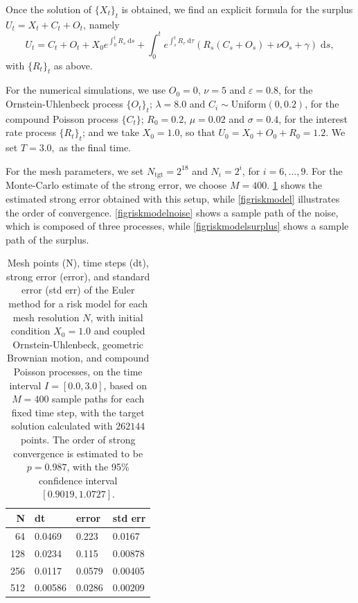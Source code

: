 \documentclass[reqno,12pt]{amsart}
\theoremstyle{plain} %
\theoremstyle{definition} %
\begin{document}
Once the solution of $\{X_t\}_t$ is obtained, we find an explicit formula for the surplus $U_t = X_t + C_t + O_t$, namely
\[
  U_t = C_t + O_t + X_0 e^{\int_0^t R_s\;\mathrm{d}s} + \int_0^t e^{\int_s^t R_\tau\;\mathrm{d}\tau} (R_s (C_s + O_s) + \nu O_s + \gamma)\;\mathrm{d}s,
\]
with $\{R_t\}_t$ as above.

For the numerical simulations, we use $O_0 = 0$, $\nu = 5$ and $\varepsilon = 0.8$, for the Ornstein-Uhlenbeck process $\{O_t\}_t$; $\lambda = 8.0$ and $C_i \sim \mathrm{Uniform}(0, 0.2)$, for the compound Poisson process $\{C_t\}$; $R_0 = 0.2$, $\mu = 0.02$ and $\sigma = 0.4$, for the interest rate process $\{R_t\}_t$; and we take $X_0 = 1.0$, so that $U_0 = X_0 + O_0 + R_0 = 1.2$. We set $T = 3.0,$ as the final time.

For the mesh parameters, we set $N_{\textrm{tgt}} = 2^{18}$ and $N_i = 2^i$, for $i=6, \ldots, 9$. For the Monte-Carlo estimate of the strong error, we choose $M = 400.$ \cref{tableriskmodel} shows the estimated strong error obtained with this setup, while \cref{figriskmodel} illustrates the order of convergence. \cref{figriskmodelnoise} shows a sample path of the noise, which is composed of three processes, while \cref{figriskmodelsurplus} shows a sample path of the surplus.

\begin{table}
    \begin{tabular}[htb]{|r|l|l|l|}
        \hline N & dt & error & std err \\
        \hline \hline
        64 & 0.0469 & 0.223 & 0.0167 \\
        128 & 0.0234 & 0.115 & 0.00878 \\
        256 & 0.0117 & 0.0579 & 0.00405 \\
        512 & 0.00586 & 0.0286 & 0.00209 \\
        \hline
    \end{tabular}
    \bigskip

    \caption{Mesh points (N), time steps (dt), strong error (error), and standard error (std err) of the Euler method for a risk model for each mesh resolution $N$, with initial condition $X_0 = 1.0$ and coupled Ornstein-Uhlenbeck, geometric Brownian motion, and compound Poisson processes, on the time interval $I = [0.0, 3.0]$, based on $M = 400$ sample paths for each fixed time step, with the target solution calculated with $262144$ points. The order of strong convergence is estimated to be $p = 0.987$, with the 95\% confidence interval $[0.9019, 1.0727]$.}
    \label{tableriskmodel}
\end{table}
\end{document}
